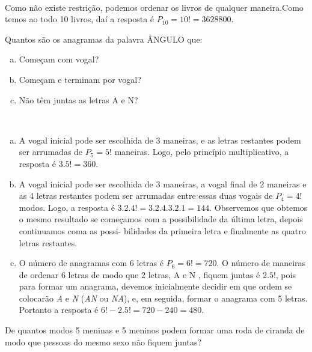\documentclass[a4paper, 12pt, addpoints]{exam}
\begin{document}
\begin{questions}
\begin{resp}~

  Como não existe restrição, podemos ordenar os livros de qualquer maneira.Como temos ao todo 10 livros, daí a resposta é $P_10 = 10! = 3628800$.
\end{resp}

\question Quantos são os anagramas da palavra ÂNGULO que:

\begin{enumerate}[a)]
    \item Começam com vogal?
    \item Começam e terminam por vogal?
    \item Não têm juntas as letras A e N?
\end{enumerate}

\begin{resp}~

  \begin{enumerate}[a)]
    \item A vogal inicial pode ser escolhida de 3 maneiras, e as letras restantes podem ser arrumadas de $P_5 = 5!$ maneiras. Logo, pelo princípio multiplicativo, a resposta é $3 . 5! = 360$.
    \item A vogal inicial pode ser escolhida de 3 maneiras, a vogal final de 2 maneiras e as 4 letras restantes podem ser arrumadas entre essas duas vogais de $P_4 = 4!$ modos. Logo, a resposta é $3 . 2 . 4! = 3 . 2 . 4 . 3 . 2 . 1 = 144$. Observemos que obtemos o mesmo resultado se começamos com a possibilidade da última letra, depois continuamos coma as possi-
    bilidades da primeira letra e finalmente as quatro letras restantes.
    \item O número de anagramas com 6 letras é $P_6 = 6! = 720$. O número de maneiras de ordenar 6 letras de modo que 2 letras, A e N , fiquem juntas é $2 . 5!$, pois para formar um anagrama, devemos inicialmente decidir em que ordem se colocarão \textit{A} e \textit{N} (\textit{AN} ou \textit{NA}), e, em seguida, formar o anagrama com 5 letras. Portanto a resposta é $6! - 2.5! = 720 - 240 = 480$.

  \end{enumerate}
\end{resp}



\question De quantos modos 5 meninas e 5 meninos podem formar uma roda de
ciranda de modo que pessoas do mesmo sexo não fiquem juntas?

\begin{resp}~


\end{resp}
\end{questions}
\end{document}
